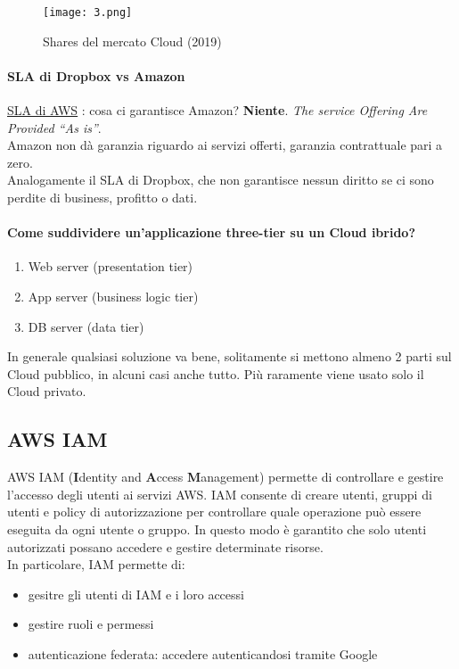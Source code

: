 \begin{figure}[h!]
    \centering
    \texttt{[image: 3.png]}
    \caption{Shares del mercato Cloud (2019)}
\end{figure}

\paragraph{SLA di Dropbox vs Amazon}
\href{https://aws.amazon.com/agreement}{SLA di AWS} : cosa ci garantisce Amazon? \textbf{Niente}. \textit{The service Offering Are Provided “As is”}.\\
Amazon non dà garanzia riguardo ai servizi offerti, garanzia contrattuale pari a zero.\\
Analogamente il SLA di Dropbox, che non garantisce nessun diritto se ci sono perdite di business, profitto o dati.

\newpage
\paragraph{Come suddividere un’applicazione three-tier su un Cloud ibrido?} 
\begin{enumerate}
    \item Web server (presentation tier)
    \item App server (business logic tier)
    \item DB server (data tier)
\end{enumerate}
In generale qualsiasi soluzione va bene, solitamente si mettono almeno 2 parti sul Cloud pubblico, in alcuni casi anche tutto. Più raramente viene usato solo il Cloud privato.

\subsection{AWS IAM}
AWS IAM  (\textbf{I}dentity and \textbf{A}ccess \textbf{M}anagement) permette di controllare e gestire l'accesso degli utenti ai servizi AWS. IAM consente di creare utenti, gruppi di utenti e policy di autorizzazione per controllare quale operazione può essere eseguita da ogni utente o gruppo. In questo modo è garantito che solo utenti autorizzati possano accedere e gestire determinate risorse.\\
In particolare, IAM permette di:
\begin{itemize}
    \item gesitre gli utenti di IAM e i loro accessi
    \item gestire ruoli e permessi
    \item autenticazione federata: accedere autenticandosi tramite Google
\end{itemize}

